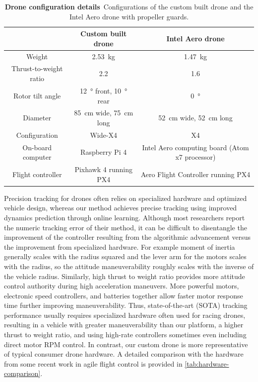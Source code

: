 \begin{table}[ht]
    \centering
    \begin{tabular}{c|cc}
    & Custom built drone & Intel Aero drone \\
    \hline
    Weight & \SI{2.53}{kg} & \SI{1.47}{kg} \\
    Thrust-to-weight ratio & 2.2 & 1.6 \\ 
    Rotor tilt angle & \SI{12}{\degree} front, \SI{10}{\degree} rear & \SI{0}{\degree} \\ 
    Diameter & \SI{85}{cm} wide, \SI{75}{cm} long & \SI{52}{cm} wide, \SI{52}{cm} long \\ 
    Configuration & Wide-X4 & X4 \\
    On-board computer & Raspberry Pi 4 & Intel Aero computing board (Atom x7 processor) \\
    Flight controller & Pixhawk 4 running PX4 & Aero Flight Controller running PX4 \\
    \end{tabular}
    \caption{\textbf{Drone configuration details}~Configurations of the custom built drone and the Intel Aero drone with propeller guards.}
    \label{tab:drone_configuration}
\end{table}

Precision tracking for drones often relies on specialized hardware and optimized vehicle design, whereas our method achieves precise tracking using improved dynamics prediction through online learning. 
Although most researchers report the numeric tracking error of their method, it can be difficult to disentangle the improvement of the controller resulting from the algorithmic advancement versus the improvement from specialized hardware. For example moment of inertia generally scales with the radius squared and the lever arm for the motors scales with the radius, so the attitude maneuverability roughly scales with the inverse of the vehicle radius. Similarly, high thrust to weight ratio provides more attitude control authority during high acceleration maneuvers. More powerful motors, electronic speed controllers, and batteries together allow faster motor response time further improving maneuverability. Thus, state-of-the-art (SOTA) tracking performance usually requires specialized hardware often used for racing drones, resulting in a vehicle with greater maneuverability than our platform, a higher thrust to weight ratio, and using high-rate controllers sometimes even including direct motor RPM control. In contrast, our custom drone is more representative of typical consumer drone hardware. A detailed comparison with the hardware from some recent work in agile flight control is provided in \cref{tab:hardware-comparison}.

